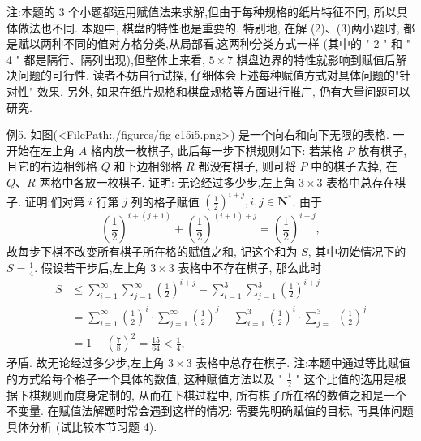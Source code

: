 注:本题的 3 个小题都运用赋值法来求解,但由于每种规格的纸片特征不同, 所以具体做法也不同.
本题中, 棋盘的特性也是重要的.
特别地, 在解 (2)、(3)两小题时, 都是赋以两种不同的值对方格分类,从局部看,这两种分类方式一样 (其中的 " 2 " 和 " 4 " 都是隔行、隔列出现),但整体上来看, $5 \times 7$ 棋盘边界的特性就影响到赋值后解决问题的可行性.
读者不妨自行试探, 仔细体会上述每种赋值方式对具体问题的"针对性" 效果.
另外, 如果在纸片规格和棋盘规格等方面进行推广, 仍有大量问题可以研究.



例5. 如图(<FilePath:./figures/fig-c15i5.png>) 是一个向右和向下无限的表格.
一开始在左上角 $A$ 格内放一枚棋子, 此后每一步下棋规则如下: 若某格 $P$ 放有棋子, 且它的右边相邻格 $Q$ 和下边相邻格 $R$ 都没有棋子, 则可将 $P$ 中的棋子去掉, 在 $Q 、 R$ 两格中各放一枚棋子.
证明: 无论经过多少步,左上角 $3 \times 3$ 表格中总存在棋子.
证明:们对第 $i$ 行第 $j$ 列的格子赋值 $\left(\frac{1}{2}\right)^{i+j}, i, j \in \mathbf{N}^*$. 由于
$$
\left(\frac{1}{2}\right)^{i+(j+1)}+\left(\frac{1}{2}\right)^{(i+1)+j}=\left(\frac{1}{2}\right)^{i+j},
$$
故每步下棋不改变所有棋子所在格的赋值之和, 记这个和为 $S$, 其中初始情况下的 $S=\frac{1}{4}$.
假设若干步后,左上角 $3 \times 3$ 表格中不存在棋子, 那么此时
$$
\begin{aligned}
S & \leqslant \sum_{i=1}^{\infty} \sum_{j=1}^{\infty}\left(\frac{1}{2}\right)^{i+j}-\sum_{i=1}^3 \sum_{j=1}^3\left(\frac{1}{2}\right)^{i+j} \\
& =\sum_{i=1}^{\infty}\left(\frac{1}{2}\right)^i \cdot \sum_{j=1}^{\infty}\left(\frac{1}{2}\right)^j-\sum_{i=1}^3\left(\frac{1}{2}\right)^i \cdot \sum_{j=1}^3\left(\frac{1}{2}\right)^j \\
& =1-\left(\frac{7}{8}\right)^2=\frac{15}{64}<\frac{1}{4},
\end{aligned}
$$
矛盾.
故无论经过多少步,左上角 $3 \times 3$ 表格中总存在棋子.
注:本题中通过等比赋值的方式给每个格子一个具体的数值, 这种赋值方法以及 " $\frac{1}{2}$ " 这个比值的选用是根据下棋规则而度身定制的, 从而在下棋过程中, 所有棋子所在格的数值之和是一个不变量.
在赋值法解题时常会遇到这样的情况: 需要先明确赋值的目标, 再具体问题具体分析 (试比较本节习题 4).



